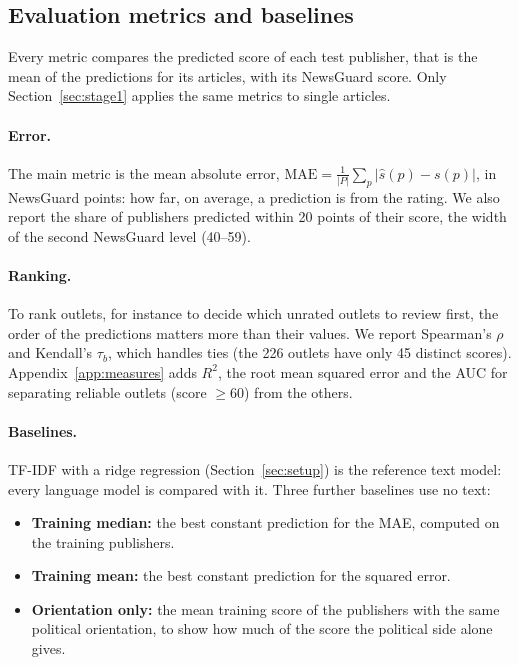\documentclass[11pt,a4paper]{article}
\begin{document}
\subsection{Evaluation metrics and baselines}\label{sec:metrics}
Every metric compares the predicted score of each test publisher, that is the mean of the predictions for its
articles, with its NewsGuard score. Only Section~\ref{sec:stage1} applies the same metrics to single articles.

\paragraph{Error.} The main metric is the mean absolute error, $\mathrm{MAE} = \frac{1}{|P|} \sum_{p} |\hat{s}(p) -
s(p)|$, in NewsGuard points: how far, on average, a prediction is from the rating. We also report the share of
publishers predicted within 20 points of their score, the width of the second NewsGuard level (40--59).

\paragraph{Ranking.} To rank outlets, for instance to decide which unrated outlets to review first, the order of the
predictions matters more than their values. We report Spearman's $\rho$ and Kendall's $\tau_b$, which handles ties (the
226 outlets have only 45 distinct scores). Appendix~\ref{app:measures} adds $R^2$, the root mean squared
error and the AUC for separating reliable outlets (score $\geq 60$) from the others.

\paragraph{Baselines.} TF-IDF with a ridge regression (Section~\ref{sec:setup}) is the reference text model: every
language model is compared with it. Three further baselines use no text:
\begin{itemize}
  \item \textbf{Training median:} the best constant prediction for the MAE, computed on the training publishers.
  \item \textbf{Training mean:} the best constant prediction for the squared error.
  \item \textbf{Orientation only:} the mean training score of the publishers with the same political orientation, to
        show how much of the score the political side alone gives.
\end{itemize}
\end{document}
